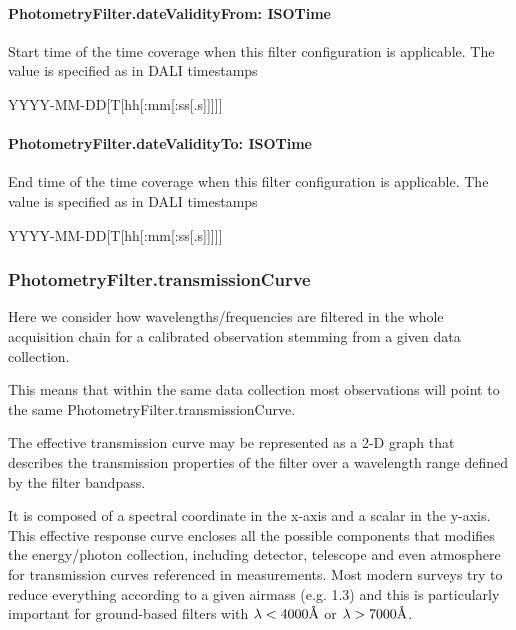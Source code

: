 \documentclass[11pt,a4paper]{ivoa}
\newcommand{\angstrom}{\mbox{\normalfont\AA}}
\begin{document}
\paragraph{PhotometryFilter.dateValidityFrom: ISOTime}
Start time of the time coverage when this filter configuration is 
applicable. The value is specified as in DALI \citep{2017ivoa.spec.0517D} 
timestamps\par

YYYY-MM-DD[T[hh[:mm[:ss[.s]]]]]
\bigskip



\paragraph{PhotometryFilter.dateValidityTo: ISOTime}
End time of the time coverage when this filter configuration is 
applicable. The value is specified as in DALI \citep{2017ivoa.spec.0517D} 
timestamps\par


YYYY-MM-DD[T[hh[:mm[:ss[.s]]]]]
\bigskip


\subsubsection{PhotometryFilter.transmissionCurve}
Here we consider how wavelengths/frequencies are filtered in the whole 
acquisition chain for a calibrated observation stemming from a given 
data collection.
\par

This means that within the same data collection most observations will 
point to the same PhotometryFilter.transmissionCurve.
\par

The effective transmission curve may be represented as a 2-D graph that 
describes the transmission properties of the filter over a wavelength 
range defined by the filter bandpass.
\par

It is composed of a spectral coordinate in the x-axis and a scalar in 
the y-axis. This effective response curve encloses all the possible 
components that modifies the energy/photon collection, including detector, 
telescope and even atmosphere for transmission curves referenced in 
measurements. 
Most modern surveys try to reduce everything according to a given airmass 
(e.g. 1.3) and this is particularly important for ground-based filters 
with $\lambda < 4000 \angstrom $ or  $\lambda > 7000 \angstrom $.
\par
\end{document}
